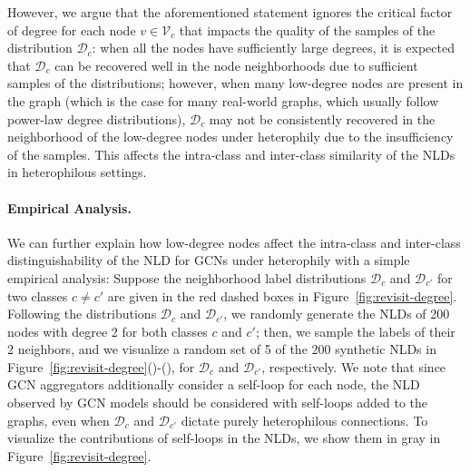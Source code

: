 However, we argue that the aforementioned statement ignores the critical factor of degree for each node $v \in \mathcal{V}_c$ that impacts the quality of the samples of the distribution $\mathcal{D}_c$: when all the nodes have sufficiently large degrees, it is expected that $\mathcal{D}_c$ can be recovered well in the node neighborhoods due to sufficient samples of the distributions; however, when many low-degree nodes are present in the graph (which is the case for many real-world graphs, which usually follow power-law degree distributions), $\mathcal{D}_c$ may not be consistently recovered in the neighborhood of the low-degree nodes under heterophily due to the insufficiency of the samples. This affects the intra-class and inter-class similarity of the NLDs in heterophilous settings.


\paragraph{Empirical Analysis.} We can further explain how low-degree nodes affect the intra-class and inter-class distinguishability of the NLD for GCNs under heterophily with a simple empirical analysis: 
Suppose the neighborhood label distributions $\mathcal{D}_c$ and $\mathcal{D}_{c'}$ for two classes $c \neq c'$ are given in the red dashed boxes in Figure~\ref{fig:revisit-degree}.
Following the distributions $\mathcal{D}_c$ and $\mathcal{D}_{c'}$, we randomly generate the NLDs of 200 nodes with degree 2 for both classes $c$ and $c'$; then, we sample the labels of their 2 neighbors, and we visualize a random set of 5 of the 200 synthetic NLDs in Figure~\ref{fig:revisit-degree}()-(), for $\mathcal{D}_c$ and $\mathcal{D}_{c'}$, respectively.
We note that since GCN aggregators additionally consider a self-loop for each node, the NLD observed by GCN models should be considered with self-loops added to the graphs, even when $\mathcal{D}_c$ and $\mathcal{D}_{c'}$ dictate purely heterophilous connections. 
To visualize the contributions of self-loops in the NLDs, we show them in gray in Figure~\ref{fig:revisit-degree}.


